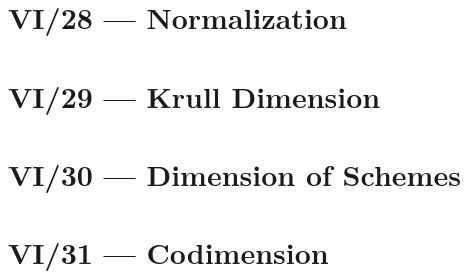 



\section{VI/28 --- Normalization}








\section{VI/29 --- Krull Dimension}







\section{VI/30 --- Dimension of Schemes}







\section{VI/31 --- Codimension}

